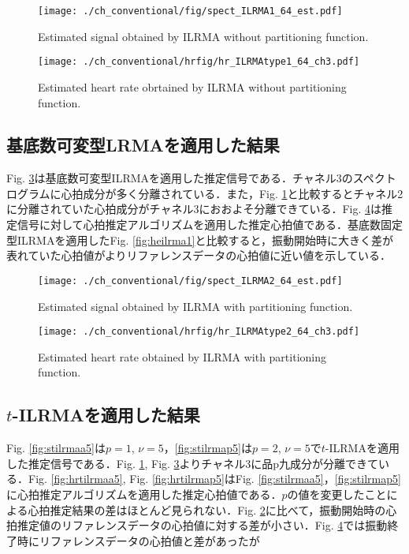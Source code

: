 {%
\begin{figure}[tb]
\centering
\texttt{[image: ./ch\_conventional/fig/spect\_ILRMA1\_64\_est.pdf]}
\caption{Estimated signal obtained by ILRMA without partitioning function.}
\label{fig:silrma1}
\end{figure}

\begin{figure}[tb]
\centering
\texttt{[image: ./ch\_conventional/hrfig/hr\_ILRMAtype1\_64\_ch3.pdf]}
\caption{Estimated heart rate obrtained by ILRMA without partitioning function.}
\label{fig:hrilrma1}
\end{figure}

\subsection{基底数可変型LRMAを適用した結果}
\label{sec:conv:resultilrma2}
Fig. \ref{fig:silrma2}は基底数可変型ILRMAを適用した推定信号である．チャネル3のスペクトログラムに心拍成分が多く分離されている．また，Fig. \ref{fig:silrma1}と比較するとチャネル2に分離されていた心拍成分がチャネル3におおよそ分離できている．Fig. \ref{fig:hrilrma2}は推定信号に対して心拍推定アルゴリズムを適用した推定心拍値である．基底数固定型ILRMAを適用したFig. \ref{fig:heilrma1}と比較すると，振動開始時に大きく差が表れていた心拍値がよりリファレンスデータの心拍値に近い値を示している．

\begin{figure}[tb]
\centering
\texttt{[image: ./ch\_conventional/fig/spect\_ILRMA2\_64\_est.pdf]}
\caption{Estimated signal obtained by ILRMA with partitioning function.}
\label{fig:silrma2}
\end{figure}

\begin{figure}[tb]
\centering
\texttt{[image: ./ch\_conventional/hrfig/hr\_ILRMAtype2\_64\_ch3.pdf]}
\caption{Estimated heart rate obtained by ILRMA with partitioning function.}
\label{fig:hrilrma2}
\end{figure}

\subsection{$t$-ILRMAを適用した結果}
\label{sec:conv:resulttilrma}
Fig. \ref{fig:stilrmaa5}は$p=1$, $\nu = 5$，\ref{fig:stilrmap5}は$p=2$, $\nu = 5$で$t$-ILRMAを適用した推定信号である．Fig. \ref{fig:silrma1}, Fig. \ref{fig:silrma2}よりチャネル3に品p九成分が分離できている．Fig. \ref{fig:hrtilrmaa5}, Fig. \ref{fig:hrtilrmap5}はFig. \ref{fig:stilrmaa5}，\ref{fig:stilrmap5}に心拍推定アルゴリズムを適用した推定心拍値である．$p$の値を変更したことによる心拍推定結果の差はほとんど見られない．Fig. \ref{fig:hrilrma1}に比べて，振動開始時の心拍推定値のリファレンスデータの心拍値に対する差が小さい．Fig. \ref{fig:hrilrma2}では振動終了時にリファレンスデータの心拍値と差があったが

}
